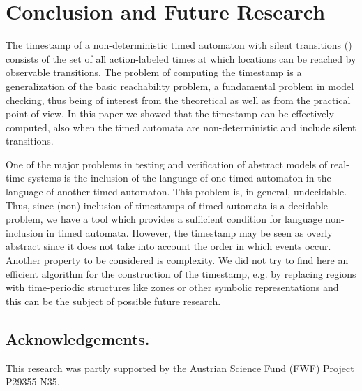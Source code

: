 \documentclass[11pt]{amsart}
\theoremstyle{definition}
\begin{document}
\section{Conclusion and Future Research}
The timestamp of a non-deterministic timed automaton with silent transitions () consists of the set of all action-labeled times at which locations can be reached by observable transitions.
The problem of computing the timestamp is a generalization of the basic reachability problem, a fundamental problem in model checking, thus being of interest from the theoretical as well as from the practical point of view.
In this paper we showed that the timestamp can be effectively computed, also when the timed automata are non-deterministic and include silent transitions.

One of the major problems in testing and verification of abstract models of real-time systems is the inclusion of the language of one timed automaton in the language of another timed automaton.
This problem is, in general, undecidable.
Thus, since (non)-inclusion of timestamps of timed automata is a decidable problem, we have a tool which provides a sufficient condition for language non-inclusion in timed automata. However, the timestamp may be seen as overly abstract since it does not take into account the order in which events occur.
Another property to be considered is complexity.
We did not try to find here an efficient algorithm for the construction of the timestamp, e.g. by replacing regions with time-periodic structures like zones or other symbolic representations \cite{MPS11}
and this can be the subject of possible future research.

\subsection*{Acknowledgements.} 
\begin{small}
	This research was partly supported by the Austrian Science Fund (FWF) Project P29355-N35. \end{small}


\end{document}
